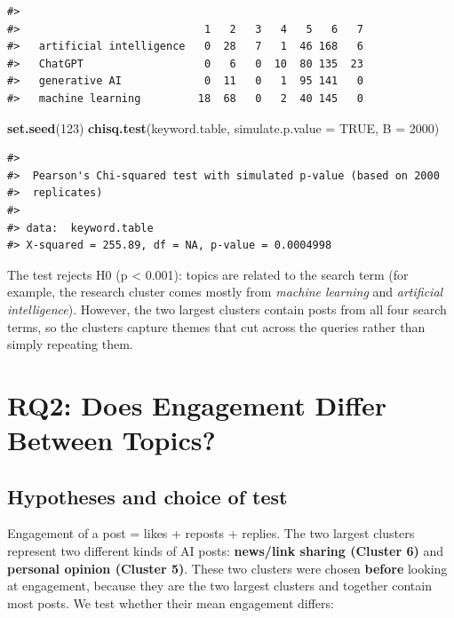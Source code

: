 \documentclass[
  10pt,
]{article}
\newenvironment{Shaded}{\begin{snugshade}}{\end{snugshade}}
\newcommand{\AttributeTok}[1]{\textcolor[rgb]{0.13,0.29,0.53}{#1}}
\newcommand{\ConstantTok}[1]{\textcolor[rgb]{0.56,0.35,0.01}{#1}}
\newcommand{\DecValTok}[1]{\textcolor[rgb]{0.00,0.00,0.81}{#1}}
\newcommand{\FunctionTok}[1]{\textcolor[rgb]{0.13,0.29,0.53}{\textbf{#1}}}
\newcommand{\NormalTok}[1]{#1}
\begin{document}
\begin{verbatim}
#>                          
#>                             1   2   3   4   5   6   7
#>   artificial intelligence   0  28   7   1  46 168   6
#>   ChatGPT                   0   6   0  10  80 135  23
#>   generative AI             0  11   0   1  95 141   0
#>   machine learning         18  68   0   2  40 145   0
\end{verbatim}

\begin{Shaded}
\begin{Highlighting}[]
\FunctionTok{set.seed}\NormalTok{(}\DecValTok{123}\NormalTok{)}
\FunctionTok{chisq.test}\NormalTok{(keyword.table, }\AttributeTok{simulate.p.value =} \ConstantTok{TRUE}\NormalTok{, }\AttributeTok{B =} \DecValTok{2000}\NormalTok{)}
\end{Highlighting}
\end{Shaded}

\begin{verbatim}
#> 
#>  Pearson's Chi-squared test with simulated p-value (based on 2000
#>  replicates)
#> 
#> data:  keyword.table
#> X-squared = 255.89, df = NA, p-value = 0.0004998
\end{verbatim}

The test rejects H0 (p \textless{} 0.001): topics are related to the
search term (for example, the research cluster comes mostly from
\emph{machine learning} and \emph{artificial intelligence}). However,
the two largest clusters contain posts from all four search terms, so
the clusters capture themes that cut across the queries rather than
simply repeating them.

\section{RQ2: Does Engagement Differ Between
Topics?}\label{rq2-does-engagement-differ-between-topics}

\subsection{Hypotheses and choice of
test}\label{hypotheses-and-choice-of-test}

Engagement of a post = likes + reposts + replies. The two largest
clusters represent two different kinds of AI posts: \textbf{news/link
sharing (Cluster 6)} and \textbf{personal opinion (Cluster 5)}. These
two clusters were chosen \textbf{before} looking at engagement, because
they are the two largest clusters and together contain most posts. We
test whether their mean engagement differs:
\end{document}
